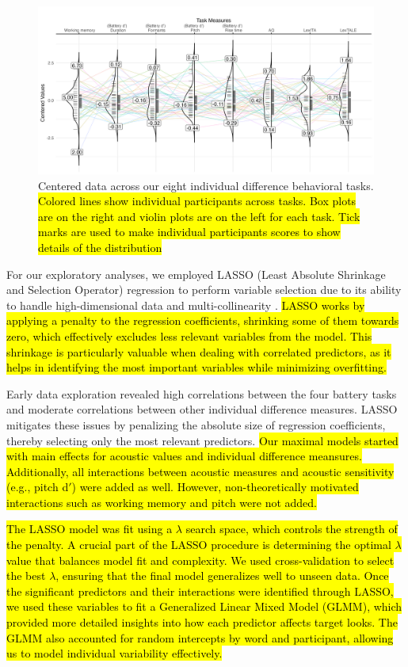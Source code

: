 \begin{figure}[H]
  \centering
  \includegraphics[width=1\linewidth]{visuals/plot_raw_task.jpeg}
  \caption{Centered data across our eight individual difference behavioral tasks. \hl{Colored lines show individual participants across tasks. Box plots are on the right and violin plots are on the left for each task. Tick marks are used to make individual participants scores to show details of the distribution}}
  \label{fig:plot_raw_task}
\end{figure}


For our exploratory analyses, we employed LASSO (Least Absolute Shrinkage and Selection Operator) regression to perform variable selection due to its ability to handle high-dimensional data and multi-collinearity \citep{Zhang2020, Tibshirani1996}. \hl{LASSO works by applying a penalty to the regression coefficients, shrinking some of them towards zero, which effectively excludes less relevant variables from the model. This shrinkage is particularly valuable when dealing with correlated predictors, as it helps in identifying the most important variables while minimizing overfitting.}

Early data exploration revealed high correlations between the four battery tasks and moderate correlations between other individual difference measures. LASSO mitigates these issues by penalizing the absolute size of regression coefficients, thereby selecting only the most relevant predictors. \hl{Our maximal models started with main effects for acoustic values and individual difference meansures. Additionally, all interactions between acoustic measures and acoustic sensitivity (e.g., pitch d$'$) were added as well. However, non-theoretically motivated interactions such as working memory and pitch were not added.}

\hl{The LASSO model was fit using a $\lambda$ search space, which controls the strength of the penalty. A crucial part of the LASSO procedure is determining the optimal $\lambda$ value that balances model fit and complexity. We used cross-validation to select the best $\lambda$, ensuring that the final model generalizes well to unseen data. Once the significant predictors and their interactions were identified through LASSO, we used these variables to fit a Generalized Linear Mixed Model (GLMM), which provided more detailed insights into how each predictor affects target looks. The GLMM also accounted for random intercepts by word and participant, allowing us to model individual variability effectively.}

